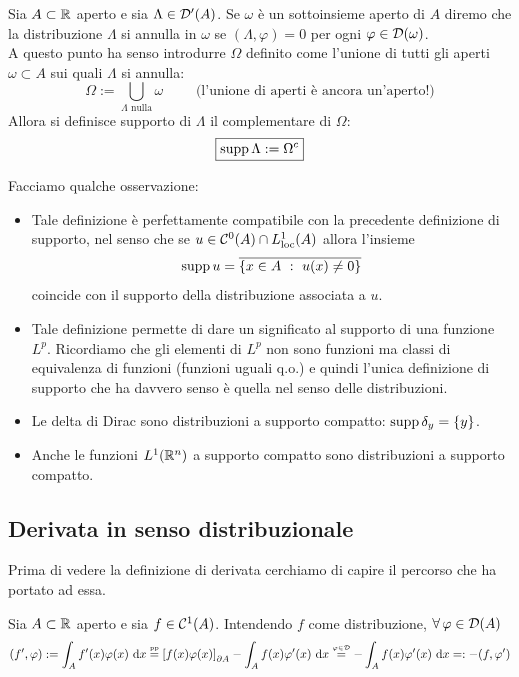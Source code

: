 \begin{defn}
Sia $A\subset\mathbb{R}$ aperto e sia $\Lambda\in\mathcal{D}'(A)$. Se $\omega$ è un sottoinsieme aperto di $A$ diremo che la distribuzione $\Lambda$ si annulla in $\omega$ se $(\Lambda,\varphi)=0$ per ogni $\varphi\in\mathcal{D}(\omega)$.\\
A questo punto ha senso introdurre $\Omega$ definito come l'unione di tutti gli aperti $\omega\subset A$ sui quali $\Lambda$ si annulla:
\begin{equation*}
\Omega:=\bigcup_{\Lambda\text{ nulla}}\omega\qquad\text{ (l'unione di aperti è ancora un'aperto!)}
\end{equation*}
Allora si definisce supporto di $\Lambda$ il complementare di $\Omega$:
\begin{equation*}
\boxed{\operatorname*{supp}\Lambda:=\Omega^c}
\end{equation*}
\end{defn}
Facciamo qualche osservazione:
\begin{itemize}
    \item Tale definizione è perfettamente compatibile con la precedente definizione di supporto, nel senso che se $u\in\mathcal{C}^0(A)\cap L^1_{\operatorname{loc}}(A)$ allora l'insieme
    \begin{equation*}
    \supp u=\overline{\{x\in A\ :\ u(x)\neq0\}}
    \end{equation*}
    coincide con il supporto della distribuzione associata a $u$.
    \item Tale definizione permette di dare un significato al supporto di una funzione $L^p$. Ricordiamo che gli elementi di $L^p$ non sono funzioni ma classi di equivalenza di funzioni (funzioni uguali q.o.) e quindi l'unica definizione di supporto che ha davvero senso è quella nel senso delle distribuzioni.
    \item  Le delta di Dirac sono distribuzioni a supporto compatto: $\operatorname*{supp}\delta_y=\{y\}$.
    \item Anche le funzioni $L^1(\mathbb{R}^n)$ a supporto compatto sono distribuzioni a supporto compatto.
\end{itemize}

\subsection{Derivata in senso distribuzionale}

Prima di vedere la definizione di derivata cerchiamo di capire il percorso che ha portato ad essa.

Sia $A\subset \mathbb{R}$ aperto e sia $f\in\mathcal{C}^1(A)$. Intendendo $f$ come distribuzione, $\forall\varphi\in\Dc(A)$
\begin{equation*}
(f',\varphi):=\int_Af'(x)\varphi(x)\  \mathrm{d} x\overset{\underset{\mathrm{pp}}{}}{=}\left[f(x)\varphi(x)\right]_{\partial A}-\int_A f(x)\varphi'(x)\  \mathrm{d} x\overset{\underset{\varphi\in\mathcal{D}}{}}{=}-\int_Af(x)\varphi'(x)\  \mathrm{d} x=:-(f,\varphi')
\end{equation*}

